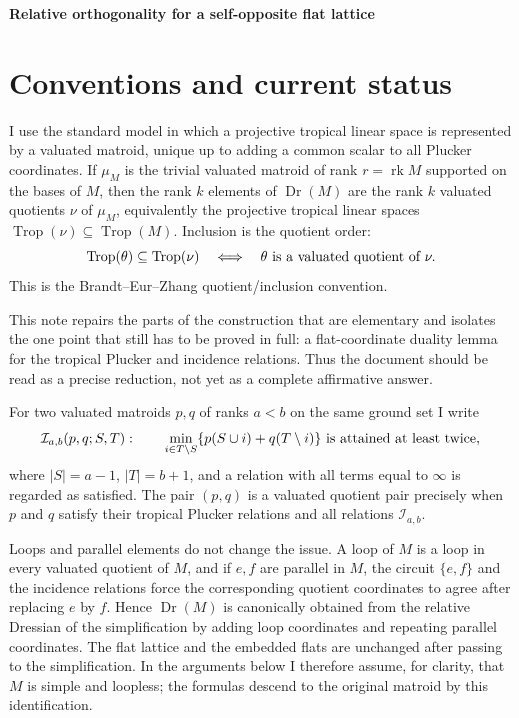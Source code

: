\documentclass[12pt]{article}
\newcommand{\Dr}{\operatorname{Dr}}
\newcommand{\Trop}{\operatorname{Trop}}
\newcommand{\rk}{\operatorname{rk}}
\begin{document}
\begin{center}
{\bf Relative orthogonality for a self-opposite flat lattice}
\end{center}

\section*{Conventions and current status}

I use the standard model in which a projective tropical linear space is
represented by a valuated matroid, unique up to adding a common scalar
to all Plucker coordinates.  If $\mu_M$ is the trivial valuated
matroid of rank $r=\rk M$ supported on the bases of $M$, then the
rank $k$ elements of $\Dr(M)$ are the rank $k$ valuated quotients
$\nu$ of $\mu_M$, equivalently the projective tropical linear spaces
$\Trop(\nu)\subseteq \Trop(M)$.  Inclusion is the quotient order:
\[
        \Trop(\theta)\subseteq \Trop(\nu)
        \quad\Longleftrightarrow\quad
        \theta\hbox{ is a valuated quotient of }\nu .
\]
This is the Brandt--Eur--Zhang quotient/inclusion convention.

This note repairs the parts of the construction that are elementary
and isolates the one point that still has to be proved in full: a
flat-coordinate duality lemma for the tropical Plucker and incidence
relations.  Thus the document should be read as a precise reduction,
not yet as a complete affirmative answer.

For two valuated matroids $p,q$ of ranks $a<b$ on the same ground set
I write
\[
  \mathcal I_{a,b}(p,q;S,T):\qquad
  \min_{i\in T\setminus S}\{p(S\cup i)+q(T\setminus i)\}
  \hbox{ is attained at least twice},
\]
where $|S|=a-1$, $|T|=b+1$, and a relation with all terms equal to
$\infty$ is regarded as satisfied.  The pair $(p,q)$ is a valuated
quotient pair precisely when $p$ and $q$ satisfy their tropical
Plucker relations and all relations $\mathcal I_{a,b}$.

Loops and parallel elements do not change the issue.  A loop of $M$
is a loop in every valuated quotient of $M$, and if $e,f$ are parallel
in $M$, the circuit $\{e,f\}$ and the incidence relations force the
corresponding quotient coordinates to agree after replacing $e$ by
$f$.  Hence $\Dr(M)$ is canonically obtained from the relative
Dressian of the simplification by adding loop coordinates and
repeating parallel coordinates.  The flat lattice and the embedded
flats are unchanged after passing to the simplification.  In the
arguments below I therefore assume, for clarity, that $M$ is simple
and loopless; the formulas descend to the original matroid by this
identification.
\end{document}
